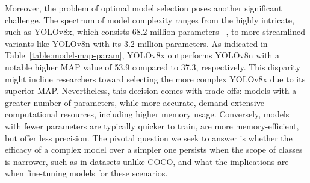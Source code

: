 Moreover, the problem of optimal model selection poses another significant challenge. The spectrum of model complexity ranges from the highly intricate, such as YOLOv8x, which consists 68.2 million parameters ~\cite{map-param}, to more streamlined variants like YOLOv8n with its 3.2 million parameters. As indicated in Table~\ref{table:model-map-param}, YOLOv8x outperforms YOLOv8n with a notable higher MAP value of 53.9 compared to 37.3, respectively. This disparity might incline researchers toward selecting the more complex YOLOv8x due to its superior MAP. Nevertheless, this decision comes with trade-offs: models with a greater number of parameters, while more accurate, demand extensive computational resources, including higher memory usage. Conversely, models with fewer parameters are typically quicker to train, are more memory-efficient, but offer less precision. The pivotal question we seek to answer is whether the efficacy of a complex model over a simpler one persists when the scope of classes is narrower, such as in datasets unlike COCO, and what the implications are when fine-tuning models for these scenarios.
